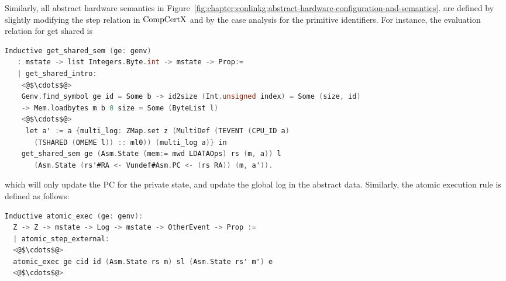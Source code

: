 Similarly, all abstract hardware semantics in  Figure~\ref{fig:chapter:conlinkg:abstract-hardware-configuration-and-semantics}.
are defined 
by slightly modifying the step relation in $\mathrm{CompCertX}$ 
and by the case analysis for the primitive identifiers. 
For instance, the evaluation relation for get shared is
\begin{lstlisting}[language=C]
 Inductive get_shared_sem (ge: genv) 
   : mstate -> list Integers.Byte.int -> mstate -> Prop:=
   | get_shared_intro: 
    <@$\cdots$@>
    Genv.find_symbol ge id = Some b -> id2size (Int.unsigned index) = Some (size, id)
    -> Mem.loadbytes m b 0 size = Some (ByteList l)
    <@$\cdots$@>
     let a' := a {multi_log: ZMap.set z (MultiDef (TEVENT (CPU_ID a)
       (TSHARED (OMEME l)) :: ml0)) (multi_log a)} in
    get_shared_sem ge (Asm.State (mem:= mwd LDATAOps) rs (m, a)) l 
       (Asm.State (rs'#RA <- Vundef#Asm.PC <- (rs RA)) (m, a')).
\end{lstlisting}
which will only update the PC for the private state,
and update the global log in the abstract data.
Similarly, the atomic execution rule is defined as follows:
\begin{lstlisting}[language=C]
Inductive atomic_exec (ge: genv):
  Z -> Z -> mstate -> Log -> mstate -> OtherEvent -> Prop :=
  | atomic_step_external:
  <@$\cdots$@>
  atomic_exec ge cid id (Asm.State rs m) sl (Asm.State rs' m') e
  <@$\cdots$@>
\end{lstlisting}


